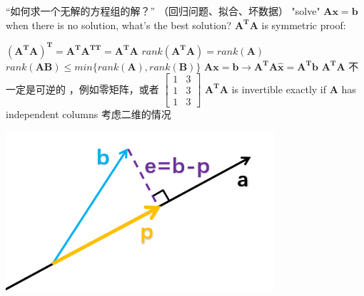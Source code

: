 \documentclass[12pt, a4paper]{article}
\begin{document}
{\noindent “如何求一个无解的方程组的解？” （回归问题、拟合、坏数据）
\newline
"solve" ${\mathbf{A}}{\mathbf{x}} = {\mathbf{b}}$ when there is no solution, what's the best solution?
\vspace{14pt}
\newline
{\textcolor{anhao-scarlet}{${\mathbf{A^{T}}}{\mathbf{A}}$ is symmetric}}
\newline
proof:
\par $({\mathbf{A^{T}}}{\mathbf{A}})^{\mathbf{T}} = {\mathbf{A^{T}}}{\mathbf{A^{TT}}} = {\mathbf{A^{T}}}{\mathbf{A}}$
\vspace{14pt}
\newline
{\textcolor{anhao-scarlet}{$rank({\mathbf{A^{T}}}{\mathbf{A}}) = rank({\mathbf{A}})$}}
\vspace{14pt}
\newline
{
	\textcolor{anhao-scarlet}
	{
		$rank({\mathbf{A}}{\mathbf{B}}) \leq min \{ rank({\mathbf{A}}), rank({\mathbf{B}}) \}$
	}
}
\vspace{14pt}
\newline
\begin{math}
	{\mathbf{A}}{\mathbf{x}} = {\mathbf{b}}
	\longrightarrow
	{\mathbf{A^{T}}}{\mathbf{A}}{\mathbf{\hat{x}}} = {\mathbf{A^{T}}}{\mathbf{b}}
\end{math}
\vspace{14pt}
\newline
{
	\textcolor{anhao-scarlet}
	{
		${\mathbf{A^{T}}}{\mathbf{A}}$ 不一定是可逆的
	}
}
，例如零矩阵，或者
\begin{math}
	\begin{bmatrix}
		1 & 3 \\
		1 & 3 \\
		1 & 3 
	\end{bmatrix}
\end{math}
\newline
{
	\textcolor{anhao-scarlet}
	{
		${\mathbf{A^{T}}}{\mathbf{A}}$ is invertible exactly if ${\mathbf{A}}$ has independent columns
	}
}
\vspace{31pt}
\newline
考虑二维的情况
\begin{center}
	\includegraphics[scale=0.8]{figures/S15-1.png}

\end{center}}
\end{document}
